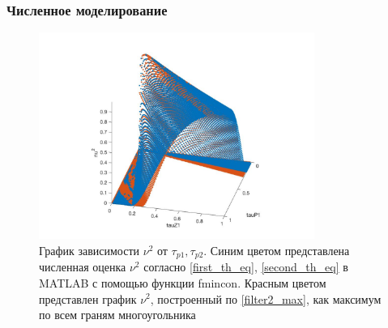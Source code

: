 \documentclass[a4paper,article,14pt]{extarticle}
\begin{document}

\subsubsection{Численное моделирование}
\begin{figure}[H]
\centering
\includegraphics[width=9cm]{images/main.jpg}
\caption{График зависимости $\nu^2$ от $\tau_{p1}, \tau_{p2}$. Синим цветом представлена численная оценка $\nu^2$ согласно \eqref{first_th_eq}, \eqref{second_th_eq} в MATLAB с помощью функции fmincon. Красным цветом представлен график $\nu^2$, построенный по \eqref{filter2_max}, как максимум по всем граням многоугольника}
\end{figure}


\pagebreak
\end{document}
